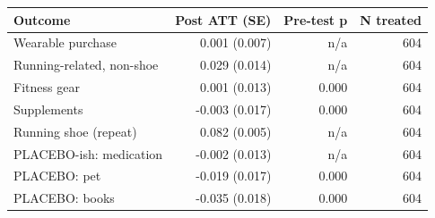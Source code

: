 \begin{tabular}{lrrr}
\toprule
Outcome & Post ATT (SE) & Pre-test p & N treated \\
\midrule
Wearable purchase & 0.001 (0.007) & n/a & 604 \\
Running-related, non-shoe & 0.029 (0.014) & n/a & 604 \\
Fitness gear & 0.001 (0.013) & 0.000 & 604 \\
Supplements & -0.003 (0.017) & 0.000 & 604 \\
Running shoe (repeat) & 0.082 (0.005) & n/a & 604 \\
PLACEBO-ish: medication & -0.002 (0.013) & n/a & 604 \\
PLACEBO: pet & -0.019 (0.017) & 0.000 & 604 \\
PLACEBO: books & -0.035 (0.018) & 0.000 & 604 \\
\bottomrule
\end{tabular}
